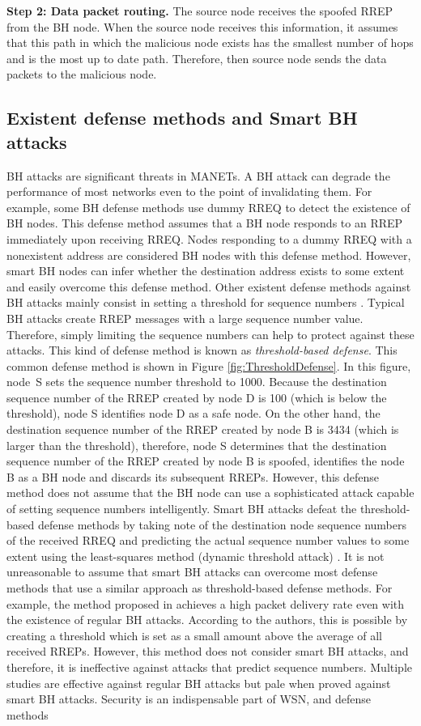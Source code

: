 \documentclass[conference]{IEEEtran}
\begin{document}
\textbf{Step 2: Data packet routing.} The source node receives the spoofed RREP from the BH node.  When the source node receives this information, it assumes that this path in which the malicious node exists has the smallest number of hops and is the most up to date path. Therefore, then source node sends the data packets to the malicious node.

\subsection{Existent defense methods and Smart BH attacks}
BH attacks are significant threats in MANETs. A BH attack can degrade the performance of most networks even to the point of invalidating them. For example, some BH defense methods use dummy RREQ \cite{13} to detect the existence of BH nodes. This defense method assumes that a BH node responds to an RREP immediately upon receiving RREQ. Nodes responding to a dummy RREQ with a nonexistent address are considered BH nodes with this defense method. However, smart BH nodes can infer whether the destination address exists to some extent and easily overcome this defense method. Other existent defense methods against BH attacks mainly consist in setting a threshold for sequence numbers \cite{5, 6}.  Typical BH attacks create RREP messages with a large sequence number value. Therefore, simply limiting the sequence numbers can help to protect against these attacks. This kind of defense method is known as \textit{threshold-based defense}. This common defense method is shown in Figure \ref{fig:ThresholdDefense}. In this figure, \mbox{node S} sets the sequence number threshold to 1000. Because the destination sequence number of the RREP created by node D is 100 (which is below the threshold), node S identifies node D as a safe node. On the other hand, the destination sequence number of the RREP created by node B is 3434 (which is larger than the threshold), therefore, node S determines that the destination sequence number of the RREP created by node B is spoofed, identifies the node B as a BH node and discards its subsequent RREPs. However, this defense method does not assume that the BH node can use a sophisticated attack capable of setting sequence numbers intelligently. Smart BH attacks defeat the threshold-based defense methods by taking note of the destination node sequence numbers of the received RREQ and predicting the actual sequence number values to some extent using the least-squares method (dynamic threshold attack) \cite{8,3}. It is not unreasonable to assume that smart BH attacks can overcome most defense methods that use a similar approach as threshold-based defense methods. For example, the method proposed in \cite{7} achieves a high packet delivery rate even with the existence of regular BH attacks. According to the authors, this is possible by creating a threshold which is set as a small amount above the average of all received RREPs. However, this method does not consider smart BH attacks, and therefore, it is ineffective against attacks that predict sequence numbers. Multiple studies \cite{10,11,12} are effective against regular BH attacks but pale when proved against smart BH attacks. Security is an indispensable part of WSN, and defense methods 
\end{document}

